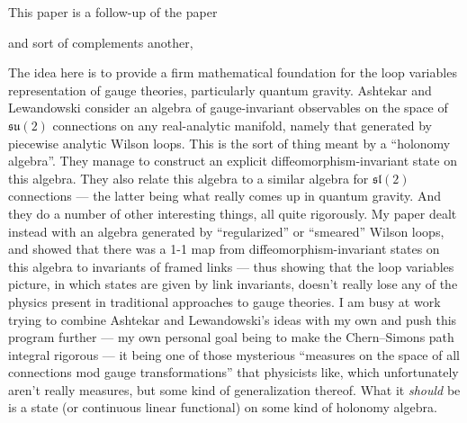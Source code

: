 \documentclass{article}
\def\tightlist{}
\renewcommand{\texttt}[1]{%
  \begingroup
  \ttfamily
  \begingroup\lccode`~=`/\lowercase{\endgroup\def~}{/\discretionary{}{}{}}%
  \begingroup\lccode`~=`[\lowercase{\endgroup\def~}{[\discretionary{}{}{}}%
  \begingroup\lccode`~=`.\lowercase{\endgroup\def~}{.\discretionary{}{}{}}%
  \catcode`/=\active\catcode`[=\active\catcode`.=\active
  \scantokens{#1\noexpand}%
  \endgroup
}
\begin{document}
\noindent
This paper is a follow-up of the paper

\noindent
and sort of complements another,


The idea here is to provide a firm mathematical foundation for the loop
variables representation of gauge theories, particularly quantum
gravity. Ashtekar and Lewandowski consider an algebra of gauge-invariant
observables on the space of \(\mathfrak{su}(2)\) connections on any
real-analytic manifold, namely that generated by piecewise analytic
Wilson loops. This is the sort of thing meant by a ``holonomy algebra''.
They manage to construct an explicit diffeomorphism-invariant state on
this algebra. They also relate this algebra to a similar algebra for
\(\mathfrak{sl}(2)\) connections --- the latter being what really comes
up in quantum gravity. And they do a number of other interesting things,
all quite rigorously. My paper dealt instead with an algebra generated
by ``regularized'' or ``smeared'' Wilson loops, and showed that there
was a 1-1 map from diffeomorphism-invariant states on this algebra to
invariants of framed links --- thus showing that the loop variables
picture, in which states are given by link invariants, doesn't really
lose any of the physics present in traditional approaches to gauge
theories. I am busy at work trying to combine Ashtekar and Lewandowski's
ideas with my own and push this program further --- my own personal goal
being to make the Chern--Simons path integral rigorous --- it being one
of those mysterious ``measures on the space of all connections mod gauge
transformations'' that physicists like, which unfortunately aren't
really measures, but some kind of generalization thereof. What it
\emph{should} be is a state (or continuous linear functional) on some
kind of holonomy algebra.
\end{document}
